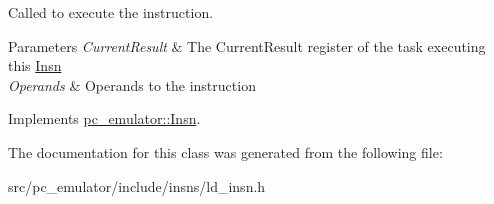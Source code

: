 Called to execute the instruction. 


\begin{DoxyParams}{Parameters}
{\em Current\+Result} & The Current\+Result register of the task executing this \hyperlink{classpc__emulator_1_1Insn}{Insn} \\
\hline
{\em Operands} & Operands to the instruction \\
\hline
\end{DoxyParams}


Implements \hyperlink{classpc__emulator_1_1Insn_a103d27030e872a799e313df16c1f3d66}{pc\+\_\+emulator\+::\+Insn}.



The documentation for this class was generated from the following file\+:\begin{DoxyCompactItemize}
\item 
src/pc\+\_\+emulator/include/insns/ld\+\_\+insn.\+h\end{DoxyCompactItemize}
